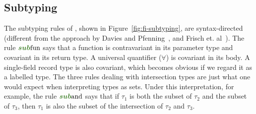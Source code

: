 \subsection{Subtyping}

\begin{comment}
In some calculi, the subtyping relation is external to the language: those
calculi are indifferent to how the subtyping relation is defined. In \name, we
take a syntatic approach, that is, subtyping is due to the syntax of types.
However, this approach does not preclude integrating other forms of subtyping
into our system. One is ``primitive'' subtyping relations such as natural
numbers being a subtype of integers. The other is nominal subtyping relations
that are explicitly declared by the programmer.
\end{comment}

\begin{figure*}
  \small
  
  \caption{Subtyping in \name.}
  \label{fig:fi-subtyping}
\end{figure*}

The subtyping rules of \name, shown in Figure~\ref{fig:fi-subtyping}, are syntax-directed
(different from the approach by Davies and Pfenning~\cite{davies2000intersection},
and Frisch et. al~\cite{frisch2008semantic}). The rule $\ruleLabelSubFun$ says that a function is
contravariant in its parameter type and covariant in its return type. A
universal quantifier ($\forall$) is covariant in its body. A single-field record
type is also covariant, which becomes obvious if we regard it as a labelled
type. The three rules dealing with intersection types are just what one would
expect when interpreting types as sets. Under this interpretation, for example,
the rule $\ruleLabelSubAnd$ says that if $\tau_1$ is both the subset of $\tau_2$
and the subset of $\tau_3$, then $\tau_1$ is also the subset of the intersection of $\tau_2$
and $\tau_3$.



